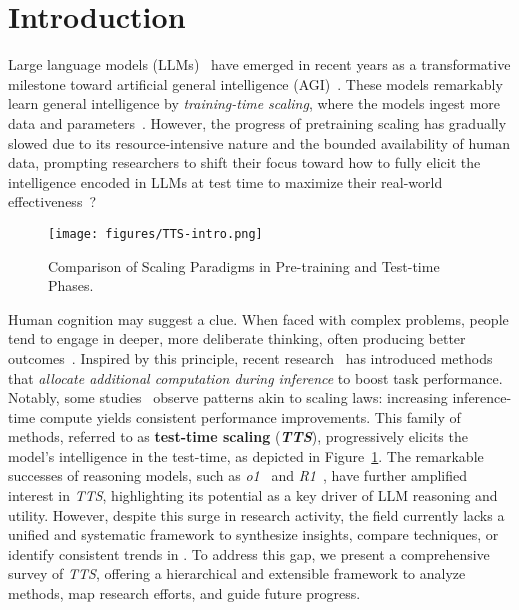 \section{Introduction}
\label{sec:intro}
Large language models (LLMs)~\citep{brown2020languagemodelsfewshotlearners,openai-gpt4} have emerged in recent years as a transformative milestone toward artificial general intelligence (AGI)~\citep{Goertzel2014148,bubeck2023sparksartificialgeneralintelligence}.
These models remarkably learn general intelligence by \emph{training-time scaling}, where the models ingest more data and parameters~\citep{kaplan2020scalinglawsneurallanguage, hoffmann2022trainingcomputeoptimallargelanguage}. 
However, the progress of pretraining scaling has gradually slowed due to its resource-intensive nature and the bounded availability of human data, prompting researchers to shift their focus toward how to fully elicit the intelligence encoded in LLMs at test time to maximize their real-world effectiveness~\citep{wei2022chain, ouyang2022training,li2024chainthoughtempowerstransformers}?

\begin{figure}[!htbp]
    \centering
    \texttt{[image: figures/TTS-intro.png]}
    \caption{Comparison of Scaling Paradigms in Pre-training and Test-time Phases.}
    \label{fig:intro}
\end{figure}


Human cognition may suggest a clue. When faced with complex problems, people tend to engage in deeper, more deliberate thinking, often producing better outcomes~\citep{kahneman2011thinking, daniel2003maps, Evans1984-EVAHAA}. 
Inspired by this principle, recent research~\citep{wei2022chain, wang2023selfconsistency} has introduced methods that \emph{allocate additional computation during inference} to boost task performance.
Notably, some studies~\citep{brown2024large, wu2024scaling} observe patterns akin to scaling laws: increasing inference-time compute yields consistent performance improvements.
This family of methods, referred to as \textbf{test-time scaling} (\textbf{\textit{TTS}}), progressively elicits the model’s intelligence in the test-time, as depicted in Figure~\ref{fig:intro}.
The remarkable successes of reasoning models, such as \textit{o1}~\citep{openai-o1} and \textit{R1}~\citep{deepseek-r1},
have further amplified interest in \textit{TTS}, highlighting its potential as a key driver of LLM reasoning and utility.
However, despite this surge in research activity, the field currently lacks a unified and systematic framework to synthesize insights, compare techniques, or identify consistent trends in \TTS. To address this gap, we present a comprehensive survey of \textit{TTS}, offering a hierarchical and extensible framework to analyze methods, map research efforts, and guide future progress.

